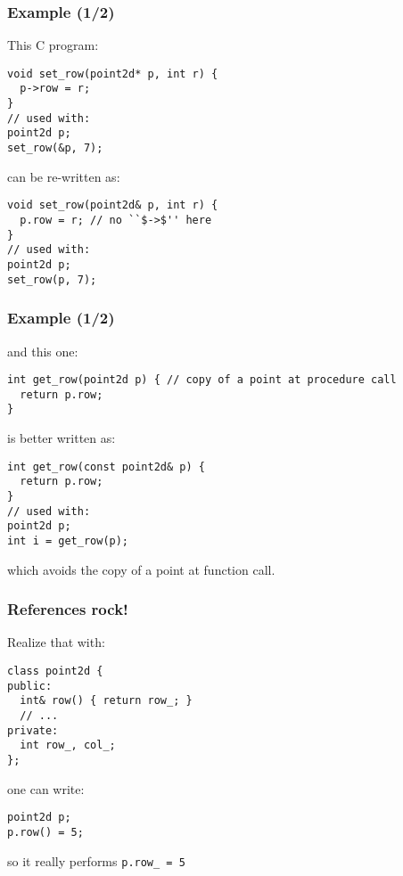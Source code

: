 \documentclass{beamer}
\newcommand{\code}[1]{{\scriptsize{\texttt{#1}}}\xspace}
\begin{document}
\begin{frame}[fragile]
  \frametitle{Example (1/2)}

This C program:

\begin{lstlisting}
void set_row(point2d* p, int r) {
  p->row = r;
}
// used with:
point2d p;
set_row(&p, 7);
\end{lstlisting}

\smallskip

can be re-written as:
\begin{lstlisting}
void set_row(point2d& p, int r) {
  p.row = r; // no ``$->$'' here
}
// used with:
point2d p;
set_row(p, 7);
\end{lstlisting}

\end{frame}


\begin{frame}[fragile]
  \frametitle{Example (1/2)}

and this one:
\begin{lstlisting}
int get_row(point2d p) { // copy of a point at procedure call
  return p.row;
}
\end{lstlisting}

\smallskip

is better written as:
\begin{lstlisting}
int get_row(const point2d& p) {
  return p.row;
}
// used with:
point2d p;
int i = get_row(p);
\end{lstlisting}
which avoids the copy of a point at function call.

\end{frame}


\begin{frame}[fragile]
  \frametitle{References rock!}

Realize that with:
\begin{lstlisting}
class point2d {
public:
  int& row() { return row_; }
  // ...
private:
  int row_, col_;
};
\end{lstlisting}

one can write:
\begin{lstlisting}
point2d p;
p.row() = 5;
\end{lstlisting}

so it really performs \code{p.row\_ = 5}

\end{frame}
\end{document}
